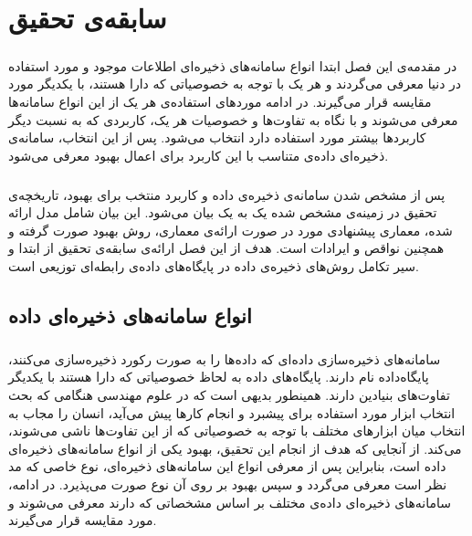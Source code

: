 
\chapter{سابقه‌ی تحقیق} \label{chapter:related-works}

\paragraph*{}
در مقدمه‌ی این فصل ابتدا انواع سامانه‌های ذخیره‌ای اطلاعات موجود و مورد استفاده در دنیا معرفی می‌گردند و هر یک با توجه به خصوصیاتی که دارا هستند، با یکدیگر مورد مقایسه قرار می‌گیرند. در ادامه موردهای استفاده‌ی هر یک از این انواع سامانه‌ها معرفی می‌شوند و با نگاه به تفاوت‌ها و خصوصیات هر یک، کاربردی که به نسبت دیگر کاربردها بیشتر مورد استفاده دارد انتخاب می‌شود. پس از این انتخاب، سامانه‌ی ذخیره‌ای داده‌ی متناسب با این کاربرد برای اعمال بهبود معرفی می‌شود.

\paragraph*{}
پس از مشخص شدن سامانه‌‌ی ذخیره‌ی داده و کاربرد منتخب برای بهبود، تاریخچه‌ی تحقیق در زمینه‌ی مشخص شده یک به یک بیان می‌شود. این بیان شامل مدل ارائه شده، معماری پیشنهادی مورد در صورت ارائه‌ی معماری، روش بهبود صورت گرفته و همچنین نواقص و ایرادات است. هدف از این فصل ارائه‌ی سابقه‌ی تحقیق از ابتدا و سیر تکامل روش‌های ذخیره‌ی داده در پایگاه‌های داده‌ی رابطه‌ای توزیعی است.

\section{انواع سامانه‌های ذخیره‌ای داده} \label{section:distributed-database-types}

\paragraph*{}
سامانه‌های ذخیره‌سازی داده‌ای که داده‌ها را به صورت رکورد ذخیره‌سازی می‌کنند، پایگاه‌داده نام دارند. پایگاه‌های داده به لحاظ خصوصیاتی که دارا هستند با یکدیگر تفاوت‌های بنیادین دارند. همینطور بدیهی است که در علوم مهندسی هنگامی که بحث انتخاب ابزار مورد استفاده برای پیشبرد و انجام کارها پیش می‌آید، انسان را مجاب به انتخاب میان ابزارهای مختلف با توجه به خصوصیاتی که از این تفاوت‌ها ناشی می‌شوند، می‌کند. از آنجایی که هدف از انجام این تحقیق، بهبود یکی از انواع سامانه‌های ذخیره‌ای داده است، بنابراین پس از معرفی انواع این سامانه‌های ذخیره‌ای، نوع خاصی که مد نظر است معرفی می‌گردد و سپس بهبود بر روی آن نوع صورت می‌پذیرد. در ادامه، سامانه‌های ذخیره‌ای داده‌ی مختلف بر اساس مشخصاتی که دارند معرفی می‌شوند و مورد مقایسه قرار می‌گیرند.

